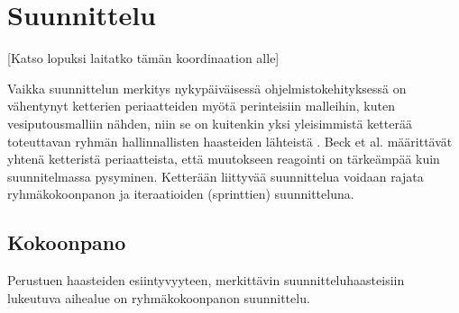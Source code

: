 \chapter{Suunnittelu}

[Katso lopuksi laitatko tämän koordinaation alle]

Vaikka suunnittelun merkitys nykypäiväisessä ohjelmistokehityksessä on vähentynyt ketterien periaatteiden myötä perinteisiin malleihin, kuten vesiputousmalliin nähden, niin se on kuitenkin yksi yleisimmistä ketterää toteuttavan ryhmän hallinnallisten haasteiden lähteistä \cite{7872736}. Beck et al. \cite{beck2001agile} määrittävät yhtenä ketteristä periaatteista, että muutokseen reagointi on tärkeämpää kuin suunnitelmassa pysyminen. Ketterään liittyvää suunnittelua voidaan rajata ryhmäkokoonpanon ja iteraatioiden (sprinttien) suunnitteluna. 

\section{Kokoonpano}

Perustuen haasteiden esiintyvyyteen, merkittävin suunnitteluhaasteisiin lukeutuva aihealue on ryhmäkokoonpanon suunnittelu. 
